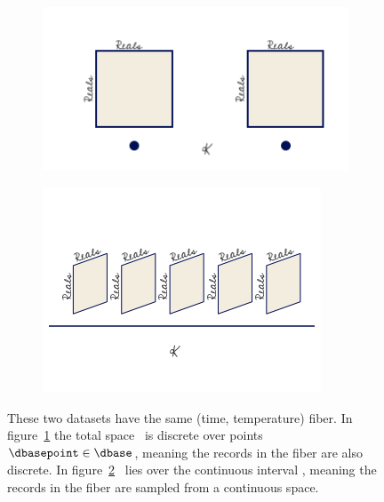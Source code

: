 \documentclass[../main.tex]{subfiles}
\begin{document}
\begin{figure}[ht!]
    \begin{subfigure}{.5\textwidth}
        \includegraphics[width=\textwidth]{figures/math/temp_1k.png}
        \caption{}
        \label{fig:base_example_discrete}
    \end{subfigure}
    \begin{subfigure}{.5\textwidth}
        \includegraphics[width=\textwidth]{figures/math/temp_2f.png}
        \caption{}
        \label{fig:base_example_continuous}
    \end{subfigure}
    \caption{These two datasets have the same (time, temperature) fiber. In figure~\ref{fig:base_example_discrete} the total space \dtotal\ is discrete over points $\dbasepoint \in \dbase$, meaning the records in the fiber are also discrete. In figure~\ref{fig:base_example_continuous} \dtotal\ lies over the continuous interval \dbase, meaning the records in the fiber are sampled from a continuous space.} 
    \label{fig:base_example}
\end{figure}
\end{document}
